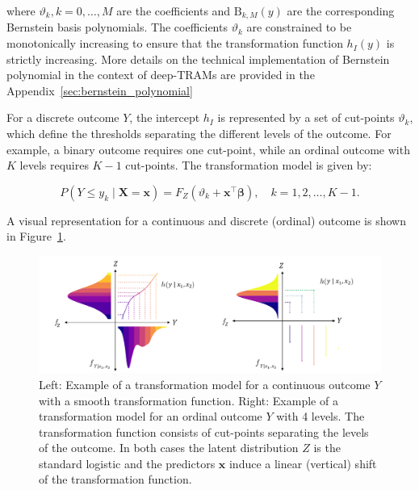 where $\vartheta_k, k = 0, \ldots, M$ are the coefficients and $\text{B}_{k, M}(y)$ are the corresponding Bernstein basis polynomials. The coefficients $\vartheta_k$ are constrained to be monotonically increasing to ensure that the transformation function $h_I(y)$ is strictly increasing. More details on the technical implementation of Bernstein polynomial in the context of deep-TRAMs are provided in the Appendix~\ref{sec:bernstein_polynomial}






For a discrete outcome $Y$, the intercept $h_I$ is represented by a set of cut-points $\vartheta_k$, which define the thresholds separating the different levels of the outcome. For example, a binary outcome requires one cut-point, while an ordinal outcome with $K$ levels requires $K-1$ cut-points. The transformation model is given by:

\begin{equation}
P(Y \leq y_k \mid \mathbf{X} = \mathbf{x}) = F_Z(\vartheta_k + \mathbf{x}^\top \boldsymbol{\beta}), \quad k = 1, 2, \ldots, K - 1.
\end{equation}


A visual representation for a continuous and discrete (ordinal) outcome is shown in Figure~\ref{fig:tram_cont_ord}.


\begin{figure}[H]
\centering
\includegraphics[width=1\textwidth]{img/tram_cont_ord.png}
\caption{Left: Example of a transformation model for a continuous outcome $Y$ with a smooth transformation function. Right: Example of a transformation model for an ordinal outcome $Y$ with 4 levels. The transformation function consists of cut-points separating the levels of the outcome.
In both cases the latent distribution $Z$ is the standard logistic and the predictors $\mathbf{x}$ induce a linear (vertical) shift of the transformation function.}
\label{fig:tram_cont_ord}
\end{figure}


